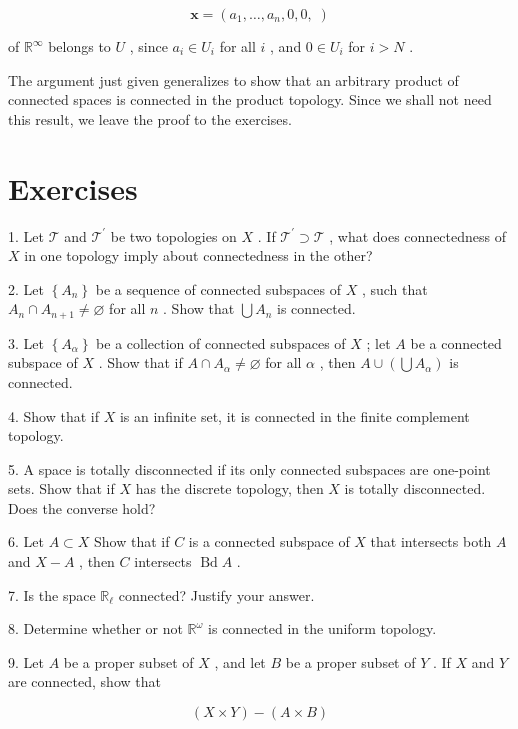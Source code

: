 \[
\mathbf{x} = \left( {{a}_{1},\ldots ,{a}_{n},0,0,\;}\right)
\]

of \({\mathbb{R}}^{\infty }\) belongs to \(U\) , since \({a}_{i} \in  {U}_{i}\) for all \(i\) , and \(0 \in  {U}_{i}\) for \(i > N\) .

The argument just given generalizes to show that an arbitrary product of connected spaces is connected in the product topology. Since we shall not need this result, we leave the proof to the exercises.

\section*{Exercises}

1. Let \(\mathcal{T}\) and \({\mathcal{T}}^{\prime }\) be two topologies on \(X\) . If \({\mathcal{T}}^{\prime } \supset  \mathcal{T}\) , what does connectedness of \(X\) in one topology imply about connectedness in the other?

2. Let \(\left\{  {A}_{n}\right\}\) be a sequence of connected subspaces of \(X\) , such that \({A}_{n} \cap  {A}_{n + 1} \neq  \varnothing\) for all \(n\) . Show that \(\bigcup {A}_{n}\) is connected.

3. Let \(\left\{  {A}_{\alpha }\right\}\) be a collection of connected subspaces of \(X\) ; let \(A\) be a connected subspace of \(X\) . Show that if \(A \cap  {A}_{\alpha } \neq  \varnothing\) for all \(\alpha\) , then \(A \cup  \left( {\bigcup {A}_{\alpha }}\right)\) is connected.

4. Show that if \(X\) is an infinite set, it is connected in the finite complement topology.

5. A space is totally disconnected if its only connected subspaces are one-point sets. Show that if \(X\) has the discrete topology, then \(X\) is totally disconnected. Does the converse hold?

6. Let \(A \subset  X\) Show that if \(C\) is a connected subspace of \(X\) that intersects both \(A\) and \(X - A\) , then \(C\) intersects \(\operatorname{Bd}A\) .

7. Is the space \({\mathbb{R}}_{\ell }\) connected? Justify your answer.

8. Determine whether or not \({\mathbb{R}}^{\omega }\) is connected in the uniform topology.

9. Let \(A\) be a proper subset of \(X\) , and let \(B\) be a proper subset of \(Y\) . If \(X\) and \(Y\) are connected, show that

\[
\left( {X \times  Y}\right)  - \left( {A \times  B}\right)
\]

